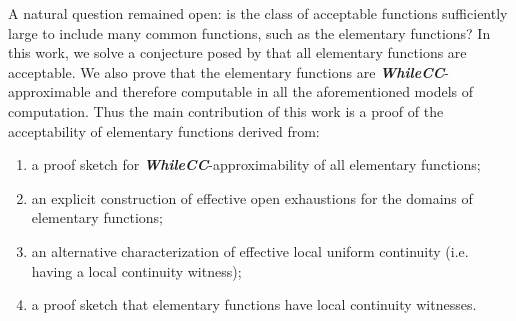 \documentclass{article}
\newcommand\WhileCC{\textit{\textbf{WhileCC}}}
\begin{document}
A natural question remained open: is the class of acceptable functions sufficiently large to include many common functions, such as the elementary functions?
In this work, we solve a conjecture posed by \cite{ModelOfCompForPartFunc_MingQuanFuAndJeffZucker} that all elementary functions are acceptable.
We also prove that the elementary functions are \WhileCC-approximable and therefore computable in all the aforementioned models of computation. Thus
the main contribution of this work is a proof of the acceptability of elementary functions derived from:
\begin{enumerate}
    \item a proof sketch for \WhileCC-approximability of all elementary functions;
    \item an explicit construction of effective open exhaustions for the domains of elementary functions;
    \item an alternative characterization of effective local uniform continuity (i.e. having a local continuity witness);
    \item a proof sketch that elementary functions have local continuity witnesses.
\end{enumerate}



\end{document}

